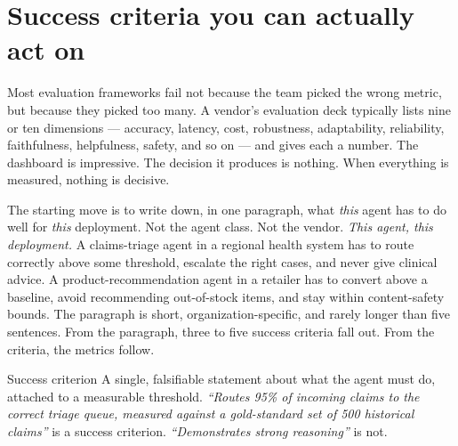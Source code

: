 \label{ch:40-evaluation-14-framework}

\starttwocol

\section{Success criteria you can actually act on}

Most evaluation frameworks fail not because the team picked the wrong metric, but because they picked too many. A vendor's evaluation deck typically lists nine or ten dimensions --- accuracy, latency, cost, robustness, adaptability, reliability, faithfulness, helpfulness, safety, and so on --- and gives each a number. The dashboard is impressive. The decision it produces is nothing. When everything is measured, nothing is decisive.

The starting move is to write down, in one paragraph, what \textit{this} agent has to do well for \textit{this} deployment. Not the agent class. Not the vendor. \textit{This agent, this deployment.} A claims-triage agent in a regional health system has to route correctly above some threshold, escalate the right cases, and never give clinical advice. A product-recommendation agent in a retailer has to convert above a baseline, avoid recommending out-of-stock items, and stay within content-safety bounds. The paragraph is short, organization-specific, and rarely longer than five sentences. From the paragraph, three to five success criteria fall out. From the criteria, the metrics follow.

\begin{TNdefinition}{Success criterion}
A single, falsifiable statement about what the agent must do, attached to a measurable threshold. \textit{``Routes 95\% of incoming claims to the correct triage queue, measured against a gold-standard set of 500 historical claims''} is a success criterion. \textit{``Demonstrates strong reasoning''} is not.
\end{TNdefinition}

